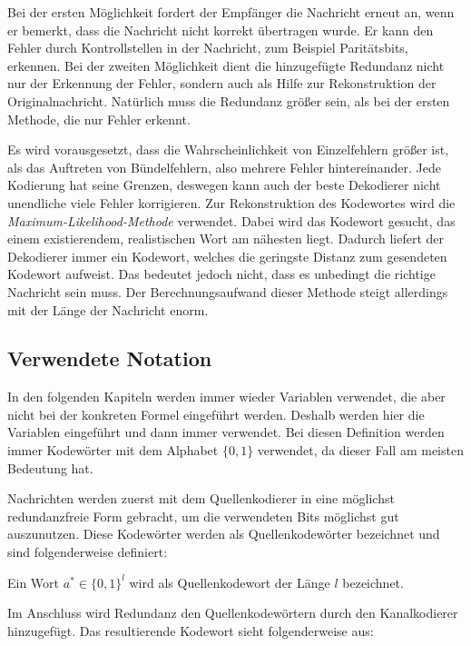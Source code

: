 Bei der ersten Möglichkeit fordert der Empfänger die Nachricht erneut an, wenn er bemerkt, dass die Nachricht nicht korrekt übertragen wurde. Er kann den Fehler durch Kontrollstellen in der Nachricht, zum Beispiel Paritätsbits, erkennen. Bei der zweiten Möglichkeit dient die hinzugefügte Redundanz nicht nur der Erkennung der Fehler, sondern auch als Hilfe zur Rekonstruktion der Originalnachricht. Natürlich muss die Redundanz größer sein, als bei der ersten Methode, die nur Fehler erkennt.

Es wird vorausgesetzt, dass die Wahrscheinlichkeit von Einzelfehlern größer ist, als das Auftreten von Bündelfehlern, also mehrere Fehler hintereinander. Jede Kodierung hat seine Grenzen, deswegen kann auch der beste Dekodierer nicht unendliche viele Fehler korrigieren. Zur Rekonstruktion des Kodewortes wird die \emph{Maximum-Likelihood-Methode} verwendet. Dabei wird das Kodewort gesucht, das einem existierendem, realistischen Wort am nähesten liegt. Dadurch liefert der Dekodierer immer ein Kodewort, welches die geringste Distanz zum gesendeten Kodewort aufweist. Das bedeutet jedoch nicht, dass es unbedingt die richtige Nachricht sein muss. Der Berechnungsaufwand dieser Methode steigt allerdings mit der Länge der Nachricht enorm.~\cite[126-129]{schoenfeld2012informations} 

\subsection{Verwendete Notation}
\label{sec:notation}
In den folgenden Kapiteln werden immer wieder Variablen verwendet, die aber nicht bei der konkreten Formel eingeführt werden. Deshalb werden hier die Variablen eingeführt und dann immer verwendet. Bei diesen Definition werden immer Kodewörter mit dem Alphabet $\{0,1\}$ verwendet, da dieser Fall am meisten Bedeutung hat.

Nachrichten werden zuerst mit dem Quellenkodierer in eine möglichst redundanzfreie Form gebracht, um die verwendeten Bits möglichst gut auszunutzen. Diese Kodewörter werden als Quellenkodewörter bezeichnet und sind folgenderweise definiert:

\begin{t_def}
Ein Wort $a^* \in \{0,1\}^l$ wird als Quellenkodewort der Länge $l$ bezeichnet.
\end{t_def}

Im Anschluss wird Redundanz den Quellenkodewörtern durch den Kanalkodierer hinzugefügt. Das resultierende Kodewort sieht folgenderweise aus:

